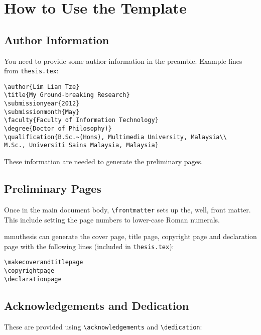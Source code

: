 \chapter{How to Use the Template}

\section{Author Information}\label{sec:author:info}
You need to provide some author information in the preamble. Example lines from \texttt{thesis.tex}:

\medskip

\begin{lstlisting}[moretexcs={submissionyear,submissionmonth,faculty,degree,qualification}]
\author{Lim Lian Tze}
\title{My Ground-breaking Research}
\submissionyear{2012}
\submissionmonth{May}
\faculty{Faculty of Information Technology}
\degree{Doctor of Philosophy)}
\qualification{B.Sc.~(Hons), Multimedia University, Malaysia\\
M.Sc., Universiti Sains Malaysia, Malaysia}
\end{lstlisting}

\medskip

These information are needed to generate the preliminary pages.


\section{Preliminary Pages}\label{sec:prelim:pages}
Once in the main document body, \lstinline[moretexcs={frontmatter}]|\frontmatter| sets up the, well, front matter. This include setting the page numbers to lower-case Roman numerals.

\textsf{mmuthesis} can generate the cover page, title page, copyright page and declaration page with the following lines (included in \texttt{thesis.tex}):

\medskip

\begin{lstlisting}[moretexcs={makecoverandtitlepage,copyrightpage,declarationpage}]
\makecoverandtitlepage
\copyrightpage
\declarationpage
\end{lstlisting}

\section{Acknowledgements and Dedication}\label{sec:acknowledge:dedication}
These are provided using \lstinline|\acknowledgements| and \lstinline|\dedication|:

